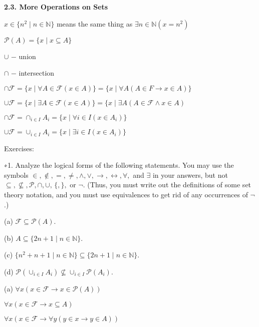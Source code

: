 \documentclass{article}
\begin{document}
\vspace{50pt}


\textbf{2.3. More Operations on Sets}

$x \in \{n^2 \mid n \in \mathbb{N}\}$ means the same thing as $\exists n \in \mathbb{N}(x = n^2)$

$\mathcal{P}(A) = \{x \mid x \subseteq A\}$

$\cup$ − union

$\cap$ − intersection

$\cap \mathcal{F} = \{x \mid \forall A \in \mathcal{F}(x \in A)\} = \{x \mid \forall A (A \in F \to x \in A)\}$

$\cup \mathcal{F} = \{x \mid \exists A \in \mathcal{F}(x \in A)\} = \{x \mid \exists A (A \in \mathcal{F} \land x \in A)$

$\cap \mathcal{F} = \cap_{i \in I}A_i = \{ x \mid \forall i \in I (x \in A_i)\}$

$\cup \mathcal{F} = \cup_{i \in I}A_i = \{ x \mid \exists i \in I (x \in A_i)\}$

\vspace{30pt}
Exercises:
\vspace{30pt}

∗1. Analyze the logical forms of the following statements. You may use the
symbols $\in , \notin, =, \neq, \land, \lor, \to, \leftrightarrow, \forall,$ and $\exists$ in your answers, but not
$\subseteq, \nsubseteq, \mathcal{P}, \cap, \cup, \, \{, \}, $ or $\neg$. (Thus, you must write out the definitions
of some set theory notation, and you must use equivalences to get rid of
any occurrences of $\neg$.)

\hspace{12pt}(a) $\mathcal{F} \subseteq \mathcal{P} (A)$.

\hspace{12pt}(b) $A \subseteq \{2n + 1 \mid n \in \mathbb{N}\}$.

\hspace{12pt}(c) $\{n^2 + n + 1 \mid n \in \mathbb{N}\} \subseteq \{2n + 1 \mid n \in \mathbb{N}\}$.

\hspace{12pt}(d) $\mathcal{P} (\cup_{i \in I} A_i) \nsubseteq \cup_{i \in I} \mathcal{P} (A_i)$.
\vspace{30pt}

(a) $\forall x (x \in \mathcal{F} \to x \in \mathcal{P}(A))$

$\forall x (x \in \mathcal{F} \to x \subseteq A)$

$\forall x (x \in \mathcal{F} \to \forall y (y \in x \to y \in A))$
\end{document}
